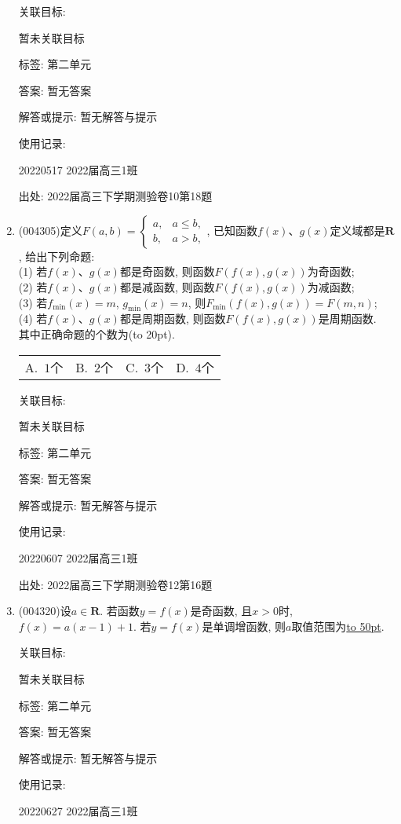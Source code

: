 \documentclass[10pt,a4paper]{article}
\newcommand{\blank}[1]{\underline{\hbox to #1pt{}}}
\newcommand{\bracket}[1]{(\hbox to #1pt{})}
\newcommand{\fourch}[4]{\par\begin{tabular}{p{.23\textwidth}p{.23\textwidth}p{.23\textwidth}p{.23\textwidth}}
A.~#1 &B.~#2& C.~#3& D.~#4
\end{tabular}}
\begin{document}
\begin{enumerate}[1.]
关联目标:

暂未关联目标



标签: 第二单元

答案: 暂无答案

解答或提示: 暂无解答与提示

使用记录:

20220517	2022届高三1班		


出处: 2022届高三下学期测验卷10第18题
\item { (004305)}定义$F(a,b)=\begin{cases} a, & a \le b, \\ b, & a>b,\end{cases}$, 已知函数$f(x)$、$g(x)$定义域都是$\mathbf{R}$, 给出下列命题:\\
(1) 若$f(x)$、$g(x)$都是奇函数, 则函数$F(f(x),g(x))$为奇函数;\\
(2) 若$f(x)$、$g(x)$都是减函数, 则函数$F(f(x),g(x))$为减函数;\\
(3) 若$f_{\min}(x)=m$, $g_{\min}(x)=n$, 则$F_{\min}(f(x),g(x))=F(m,n)$;\\
(4) 若$f(x)$、$g(x)$都是周期函数, 则函数$F(f(x),g(x))$是周期函数.\\
其中正确命题的个数为\bracket{20}.
\fourch{$1$个}{$2$个}{$3$个}{$4$个}


关联目标:

暂未关联目标



标签: 第二单元

答案: 暂无答案

解答或提示: 暂无解答与提示

使用记录:

20220607	2022届高三1班	


出处: 2022届高三下学期测验卷12第16题
\item { (004320)}设$a\in \mathbf{R}$. 若函数$y=f(x)$是奇函数, 且$x>0$时, $f(x)=a(x-1)+1$. 若$y=f(x)$是单调增函数, 则$a$取值范围为\blank{50}.


关联目标:

暂未关联目标



标签: 第二单元

答案: 暂无答案

解答或提示: 暂无解答与提示

使用记录:

20220627	2022届高三1班	



\end{enumerate}
\end{document}
